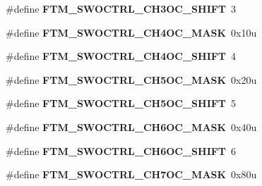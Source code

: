 \begin{DoxyCompactItemize}
\item 
\#define {\bfseries F\+T\+M\+\_\+\+S\+W\+O\+C\+T\+R\+L\+\_\+\+C\+H3\+O\+C\+\_\+\+S\+H\+I\+FT}~3\hypertarget{group__FTM__Register__Masks_ga1520a6f7f9d94248c38bb2b2a6fdd068}{}\label{group__FTM__Register__Masks_ga1520a6f7f9d94248c38bb2b2a6fdd068}

\item 
\#define {\bfseries F\+T\+M\+\_\+\+S\+W\+O\+C\+T\+R\+L\+\_\+\+C\+H4\+O\+C\+\_\+\+M\+A\+SK}~0x10u\hypertarget{group__FTM__Register__Masks_ga8e7d553c823d031e23a2ca14cef77ed4}{}\label{group__FTM__Register__Masks_ga8e7d553c823d031e23a2ca14cef77ed4}

\item 
\#define {\bfseries F\+T\+M\+\_\+\+S\+W\+O\+C\+T\+R\+L\+\_\+\+C\+H4\+O\+C\+\_\+\+S\+H\+I\+FT}~4\hypertarget{group__FTM__Register__Masks_gaf60fd436bae3cc28d58bdef99ce082c9}{}\label{group__FTM__Register__Masks_gaf60fd436bae3cc28d58bdef99ce082c9}

\item 
\#define {\bfseries F\+T\+M\+\_\+\+S\+W\+O\+C\+T\+R\+L\+\_\+\+C\+H5\+O\+C\+\_\+\+M\+A\+SK}~0x20u\hypertarget{group__FTM__Register__Masks_ga1c11baa172a252f899b39e8c96f8c213}{}\label{group__FTM__Register__Masks_ga1c11baa172a252f899b39e8c96f8c213}

\item 
\#define {\bfseries F\+T\+M\+\_\+\+S\+W\+O\+C\+T\+R\+L\+\_\+\+C\+H5\+O\+C\+\_\+\+S\+H\+I\+FT}~5\hypertarget{group__FTM__Register__Masks_ga10aa816fdf5d6c7759f2343e74dab618}{}\label{group__FTM__Register__Masks_ga10aa816fdf5d6c7759f2343e74dab618}

\item 
\#define {\bfseries F\+T\+M\+\_\+\+S\+W\+O\+C\+T\+R\+L\+\_\+\+C\+H6\+O\+C\+\_\+\+M\+A\+SK}~0x40u\hypertarget{group__FTM__Register__Masks_gae50b63621d0f71b3bc8b19f0fd851815}{}\label{group__FTM__Register__Masks_gae50b63621d0f71b3bc8b19f0fd851815}

\item 
\#define {\bfseries F\+T\+M\+\_\+\+S\+W\+O\+C\+T\+R\+L\+\_\+\+C\+H6\+O\+C\+\_\+\+S\+H\+I\+FT}~6\hypertarget{group__FTM__Register__Masks_ga6440cb11055e9d43b210a2186beff55f}{}\label{group__FTM__Register__Masks_ga6440cb11055e9d43b210a2186beff55f}

\item 
\#define {\bfseries F\+T\+M\+\_\+\+S\+W\+O\+C\+T\+R\+L\+\_\+\+C\+H7\+O\+C\+\_\+\+M\+A\+SK}~0x80u\hypertarget{group__FTM__Register__Masks_gad27d690f6ab9c6c159c25ca2375a25a4}{}\label{group__FTM__Register__Masks_gad27d690f6ab9c6c159c25ca2375a25a4}


\end{DoxyCompactItemize}
